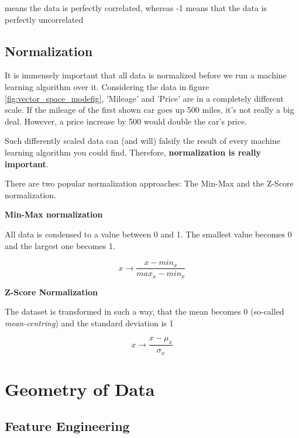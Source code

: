 \documentclass[11pt]{article}
\begin{document}
 means the data is perfectly correlated, whereas -1 means that the data is perfectly uncorrelated

\subsection{Normalization}
It is immensely important that all data is normalized before we run a machine learning algorithm over it. Considering the data in figure \ref{fig:vector_space_modefig}, 'Mileage' and 'Price' are in a completely different scale. If the mileage of the first shown car goes up 500 miles, it's not really a big deal. However, a price increase by 500 would double the car's price.

Such differently scaled data can (and will) falsify the result of every machine learning algorithm you could find. Therefore, \textbf{normalization is really important}.

\vspace{10px}

\noindent There are two popular normalization approaches: The Min-Max and the Z-Score normalization.

\newpage

\noindent \textbf{Min-Max normalization}

\noindent All data is condensed to a value between 0 and 1. The smallest value becomes 0 and the largest one becomes 1.

\begin{equation}
    x \rightarrow \frac{x - min_{x}}{max_{x}-min_{x}}
\end{equation}

\noindent \textbf{Z-Score Normalization}

\noindent The dataset is transformed in such a way, that the mean becomes 0 (so-called \textit{mean-centring}) and the standard deviation is 1

\begin{equation}
    x \rightarrow \frac{x - \mu_{x}}{\sigma_{x}}
\end{equation}

\section{Geometry of Data}

\subsection{Feature Engineering}
\end{document}
